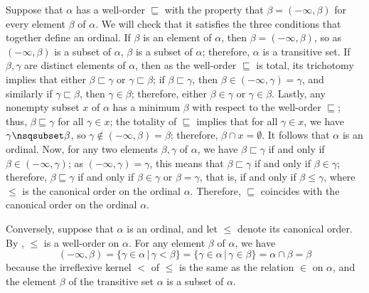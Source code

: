 \documentclass{article}
\begin{document}
Suppose that \(\alpha\) has a well-order \(\sqsubseteq\) with the
property that \(\beta = (-\infty, \beta)\) for every element \(\beta\)
of \(\alpha\).  We will check that it satisfies the three conditions
that together define an ordinal.  If \(\beta\) is an element of
\(\alpha\), then \(\beta = (-\infty, \beta)\), so as
\((-\infty, \beta)\) is a subset of \(\alpha\), \(\beta\) is a subset
of \(\alpha\); therefore, \(\alpha\) is a transitive set.  If
\(\beta, \gamma\) are distinct elements of \(\alpha\), then as the
well-order \(\sqsubseteq\) is total, its trichotomy implies that
either \(\beta \sqsubset \gamma\) or \(\gamma \sqsubset \beta\); if
\(\beta \sqsubset \gamma\), then
\(\beta \in (-\infty, \gamma) = \gamma\), and similarly if
\(\gamma \sqsubset \beta\), then \(\gamma \in \beta\); therefore,
either \(\beta \in \gamma\) or \(\gamma \in \beta\).  Lastly, any
nonempty subset \(x\) of \(\alpha\) has a minimum \(\beta\) with
respect to the well-order \(\sqsubseteq\); thus,
\(\beta \sqsubseteq \gamma\) for all \(\gamma \in x\); the totality of
\(\sqsubseteq\) implies that for all \(\gamma \in x\), we have
\(\gamma \nsqsubset \beta\), so
\(\gamma \notin (-\infty, \beta) = \beta\); therefore,
\(\beta \cap x = \emptyset\).  It follows that \(\alpha\) is an
ordinal.  Now, for any two elements \(\beta, \gamma\) of \(\alpha\),
we have \(\beta \sqsubset \gamma\) if and only if
\(\beta \in (-\infty, \gamma)\); as \((-\infty, \gamma) = \gamma\),
this means that \(\beta \sqsubset \gamma\) if and only if
\(\beta \in \gamma\); therefore, \(\beta \sqsubseteq \gamma\) if and
only if \(\beta \in \gamma\) or \(\beta = \gamma\), that is, if and
only if \(\beta \leq \gamma\), where \(\leq\) is the canonical order
on the ordinal \(\alpha\).  Therefore, \(\sqsubseteq\) coincides with
the canonical order on the ordinal \(\alpha\).

Conversely, suppose that \(\alpha\) is an ordinal, and let \(\leq\)
denote its canonical order.  By , \(\leq\) is a
well-order on \(\alpha\).  For any element \(\beta\) of \(\alpha\), we
have
\begin{displaymath}
  (-\infty, \beta) =
  \{ \gamma \in \alpha \,\vert\, \gamma < \beta \} =
  \{ \gamma \in \alpha \,\vert\, \gamma \in \beta \} =
  \alpha \cap \beta = \beta
\end{displaymath}
because the irreflexive kernel \(<\) of \(\leq\) is the same as the
relation \(\in\) on \(\alpha\), and the element \(\beta\) of the
transitive set \(\alpha\) is a subset of \(\alpha\).
\end{document}
